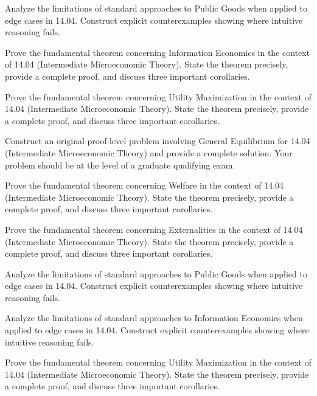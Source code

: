 \documentclass[12pt,a4paper]{exam}
\begin{document}
\begin{questions}
\vspace{0.3cm}

\question[5]
Analyze the limitations of standard approaches to Public Goods when applied to edge cases in 14.04. Construct explicit counterexamples showing where intuitive reasoning fails.

\vspace{0.3cm}

\question[7]
Prove the fundamental theorem concerning Information Economics in the context of 14.04 (Intermediate Microeconomic Theory). State the theorem precisely, provide a complete proof, and discuss three important corollaries.

\vspace{0.3cm}

\question[5]
Prove the fundamental theorem concerning Utility Maximization in the context of 14.04 (Intermediate Microeconomic Theory). State the theorem precisely, provide a complete proof, and discuss three important corollaries.

\vspace{0.3cm}

\question[2]
Construct an original proof-level problem involving General Equilibrium for 14.04 (Intermediate Microeconomic Theory) and provide a complete solution. Your problem should be at the level of a graduate qualifying exam.

\vspace{0.3cm}

\question[3]
Prove the fundamental theorem concerning Welfare in the context of 14.04 (Intermediate Microeconomic Theory). State the theorem precisely, provide a complete proof, and discuss three important corollaries.

\vspace{0.3cm}

\question[2]
Prove the fundamental theorem concerning Externalities in the context of 14.04 (Intermediate Microeconomic Theory). State the theorem precisely, provide a complete proof, and discuss three important corollaries.

\vspace{0.3cm}

\question[2]
Analyze the limitations of standard approaches to Public Goods when applied to edge cases in 14.04. Construct explicit counterexamples showing where intuitive reasoning fails.

\vspace{0.3cm}

\question[3]
Analyze the limitations of standard approaches to Information Economics when applied to edge cases in 14.04. Construct explicit counterexamples showing where intuitive reasoning fails.

\vspace{0.3cm}

\question[3]
Prove the fundamental theorem concerning Utility Maximization in the context of 14.04 (Intermediate Microeconomic Theory). State the theorem precisely, provide a complete proof, and discuss three important corollaries.

\vspace{0.3cm}

\end{questions}
\end{document}
